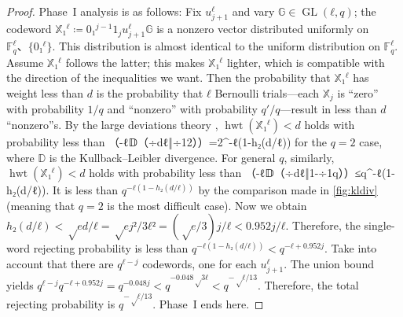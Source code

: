 \documentclass[openany]{amsbook}
\numberwithin{equation}{chapter}
\numberwithin{figure}{chapter}
\numberwithin{table}{chapter}
\DeclareMathOperator\hwt{hwt}
\DeclareMathOperator\GL{GL}
\def\[#1\]{\begin{equation*}{#1}\end{equation*}}
\theoremstyle{definition}	理dfn:Definition~?s			理exa:Example~?s
\theoremstyle{remark}		理cla:Claim~?s				理rem:Remark~?s
\begin{document}
\begin{proof}
		Phase~I analysis is as follows:
		Fix $u_{j+1}^ℓ$ and vary $𝔾∈\GL(ℓ,q)$;
		the codeword $𝕏₁^ℓ≔0₁^{j-1}1_ju_{j+1}^ℓ𝔾$ is
		a nonzero vector distributed uniformly on $𝔽_q^ℓ、\{0₁^ℓ\}$.
		This distribution is almost identical to the uniform distribution on $𝔽_q^ℓ$.
		Assume $𝕏₁^ℓ$ follows the latter;
		this makes $𝕏₁^ℓ$ lighter,
		which is compatible with the direction of the inequalities we want.
		Then the probability that $𝕏₁^ℓ$ has weight less than $d$ is the probability
		that $ℓ$ Bernoulli trials---each $𝕏_j$ is ``zero'' with probability $1/q$ and
		``nonzero'' with probability $q'/q$---result in less than $d$ ``nonzero''s.
		By the large deviations theory \cite[Exercise~2.2.23(b)]{DZ10},
		$\hwt(𝕏₁^ℓ)<d$ holds with probability less than
		\[\exp（-ℓ𝔻（÷d{ℓ}‖÷12））=2^{-ℓ(1-h₂(d/ℓ))}\]
		for the $q=2$ case, where $𝔻$ is the Kullback--Leibler divergence.
		For general $q$, similarly, $\hwt(𝕏₁^ℓ)<d$ holds with probability less than
		\[\exp（-ℓ𝔻（÷d{ℓ}‖1-÷1q））≤q^{-ℓ(1-h₂(d/ℓ))}.\]
		It is less than $q^{-ℓ(1-h₂(d/ℓ))}$ by the comparison made in \cref{fig:kldiv}
		(meaning that $q=2$ is the most difficult case).
		Now we obtain $h₂(d/ℓ)<√{ed/ℓ}=√{ej²/3ℓ²}=(√{e/3})j/ℓ<0.952j/ℓ$.
		Therefore, the single-word rejecting probability is less than
		$q^{-ℓ(1-h₂(d/ℓ))}<q^{-ℓ+0.952j}$.
		Take into account that there are $q^{ℓ-j}$ codewords, one for each $u_{j+1}^ℓ$.
		The union bound yields
		$q^{ℓ-j}q^{-ℓ+0.952j}=q^{-0.048j}<q^{-0.048√{3ℓ}}<q^{-√ℓ/13}$.
		Therefore, the total rejecting probability is $q^{-√ℓ/13}$.
		Phase~I ends here.
		

\end{proof}
\end{document}
